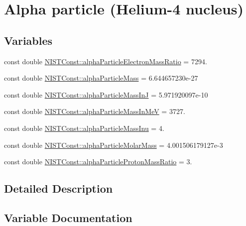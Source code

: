 \hypertarget{group___alpha}{}\section{Alpha particle (Helium-\/4 nucleus)}
\label{group___alpha}
\subsection*{Variables}
\begin{DoxyCompactItemize}
\item 
const double \hyperlink{group___alpha_ga9f00b32c60f1bc5b8a950b58e64d08c8}{N\+I\+S\+T\+Const\+::alpha\+Particle\+Electron\+Mass\+Ratio} = 7294.
\item 
const double \hyperlink{group___alpha_ga5a2a4f4310d2e3584253471fe4381b93}{N\+I\+S\+T\+Const\+::alpha\+Particle\+Mass} = 6.\+644657230e-\/27
\item 
const double \hyperlink{group___alpha_ga4a65b49a93c81dff12ac24366f68e4e9}{N\+I\+S\+T\+Const\+::alpha\+Particle\+Mass\+InJ} = 5.\+971920097e-\/10
\item 
const double \hyperlink{group___alpha_ga8dd1d38f58ef9d77f39c26be9bb849e0}{N\+I\+S\+T\+Const\+::alpha\+Particle\+Mass\+In\+MeV} = 3727.
\item 
const double \hyperlink{group___alpha_ga1233ffb0d6537e112ce39623e6c6d0d5}{N\+I\+S\+T\+Const\+::alpha\+Particle\+Mass\+Inu} = 4.
\item 
const double \hyperlink{group___alpha_ga06d92f78de04d4e1d79b8468b04959ef}{N\+I\+S\+T\+Const\+::alpha\+Particle\+Molar\+Mass} = 4.\+001506179127e-\/3
\item 
const double \hyperlink{group___alpha_ga4629465057dc35ad7eecca610bcbd092}{N\+I\+S\+T\+Const\+::alpha\+Particle\+Proton\+Mass\+Ratio} = 3.
\end{DoxyCompactItemize}


\subsection{Detailed Description}


\subsection{Variable Documentation}
\mbox{\label{group___alpha_ga9f00b32c60f1bc5b8a950b58e64d08c8}} 
